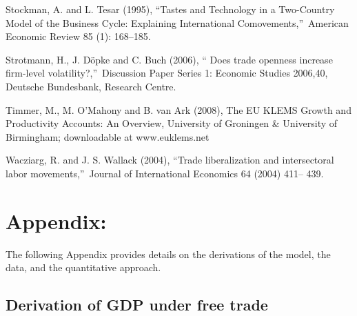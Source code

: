 \documentclass[12pt]{article}
\begin{document}
\begin{thebibliography}{99}
\bibitem{} Stockman, A. and L. Tesar (1995), \textquotedblleft Tastes and
Technology in a Two-Country Model of the Business Cycle: Explaining
International Comovements,\textquotedblright\ American Economic Review 85
(1): 168--185.

\bibitem{} Strotmann, H., J. D\"{o}pke and C. Buch (2006), \textquotedblleft
Does trade openness increase firm-level volatility?,\textquotedblright\
Discussion Paper Series 1: Economic Studies 2006,40, Deutsche Bundesbank,
Research Centre.

\bibitem{} Timmer, M., M. O'Mahony and B. van Ark (2008), The EU KLEMS
Growth and Productivity Accounts: An Overview, University of Groningen \&
University of Birmingham; downloadable at www.euklems.net

\bibitem{} Wacziarg, R. and J. S. Wallack (2004), \textquotedblleft Trade
liberalization and intersectoral labor movements,\textquotedblright\ Journal
of International Economics 64 (2004) 411-- 439.
\end{thebibliography}

\section{\textbf{Appendix:}}

The following Appendix provides details on the derivations of the model, the
data, and the quantitative approach.

\subsection{Derivation of GDP under free trade}
\end{document}
